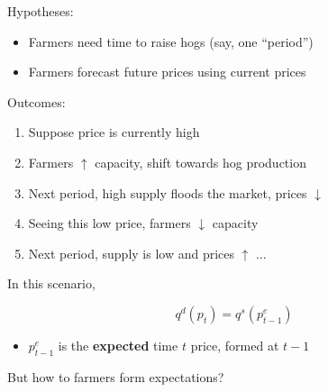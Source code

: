 \documentclass[
    xcolor={svgnames,dvipsnames},
    hyperref={colorlinks, citecolor=DeepPink4, linkcolor=DarkRed, urlcolor=DarkBlue}
    ]{beamer}  %
\newcommand{\1}{\mathbbm 1}
\begin{document}
\begin{frame}
    
    Hypotheses: 

    \begin{itemize}
        \item Farmers need time to raise hogs (say, one ``period'')
            \vspace{0.3em}
        \item Farmers forecast future prices using current prices
    \end{itemize}

    Outcomes:

    \begin{enumerate}
        \item Suppose price is currently high
            \vspace{0.3em}
        \item Farmers $\uparrow$ capacity, shift towards hog production
            \vspace{0.3em}
        \item Next period, high supply floods the market, prices $\downarrow$
            \vspace{0.3em}
        \item Seeing this low price, farmers $\downarrow$ capacity
            \vspace{0.3em}
        \item Next period, supply is low and prices $\uparrow$ ...
    \end{enumerate}

\end{frame}

\begin{frame}

    In this scenario,
    
    $$
        q^d(p_t) = q^s(p^e_{t-1})
    $$

    \begin{itemize}
        \item $p^e_{t-1}$ is the \textbf{expected} time $t$ price, formed at $t-1$
    \end{itemize}

    \vspace{1em}
    \vspace{1em}

    But how to farmers form expectations?

\end{frame}
\end{document}
